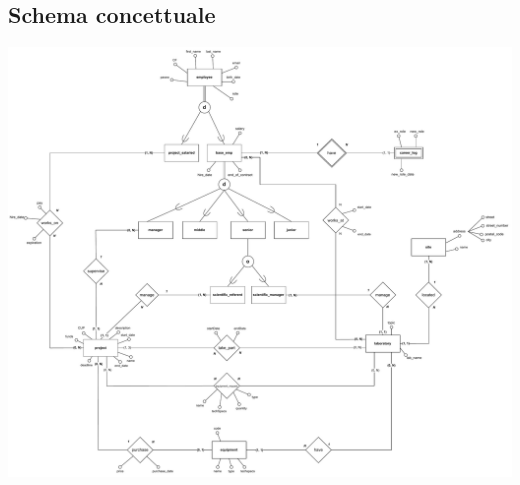 \subsection{Schema concettuale}\bigskip
\includegraphics[width=\textwidth]{images/concettualeER.drawio.pdf}

\newpage
